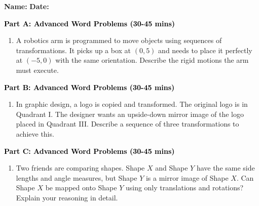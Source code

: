 \documentclass[12pt, letterpaper, fleqn]{article}
\begin{document}
\textbf{Name:} \underline{\hspace{5cm}}
\hfill
\textbf{Date:} \underline{\hspace{3cm}}\\


\begin{tcolorbox}[colback=customteal!20]
\large\textcolor{black}{\textbf{Part A: Advanced Word Problems (30-45 mins)}}
\end{tcolorbox}

\vspace{3mm}

\begin{enumerate}[itemsep=5.5cm, leftmargin=0.6cm]
\item A robotics arm is programmed to move objects using sequences of transformations. It picks up a box at $(0, 5)$ and needs to place it perfectly at $(-5, 0)$ with the same orientation. Describe the rigid motions the arm must execute.
\end{enumerate}

\newpage

\begin{tcolorbox}[colback=customteal!20]
\large\textcolor{black}{\textbf{Part B: Advanced Word Problems (30-45 mins)}}
\end{tcolorbox}

\vspace{3mm}

\begin{enumerate}[itemsep=5.5cm, leftmargin=0.6cm, resume]
\item In graphic design, a logo is copied and transformed. The original logo is in Quadrant I. The designer wants an upside-down mirror image of the logo placed in Quadrant III. Describe a sequence of three transformations to achieve this.
\end{enumerate}

\newpage

\begin{tcolorbox}[colback=customteal!20]
\large\textcolor{black}{\textbf{Part C: Advanced Word Problems (30-45 mins)}}
\end{tcolorbox}

\vspace{3mm}

\begin{enumerate}[itemsep=5.5cm, leftmargin=0.6cm, resume]
\item Two friends are comparing shapes. Shape $X$ and Shape $Y$ have the same side lengths and angle measures, but Shape $Y$ is a mirror image of Shape $X$. Can Shape $X$ be mapped onto Shape $Y$ using only translations and rotations? Explain your reasoning in detail.
\end{enumerate}
\end{document}
